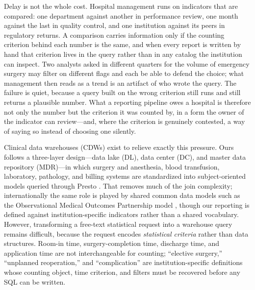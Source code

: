 \documentclass[10pt]{article}
\begin{document}
Delay is not the whole cost. Hospital management runs on indicators that are
compared: one department against another in performance review, one month against
the last in quality control, and one institution against its peers in regulatory
returns. A comparison carries information only if the counting criterion behind
each number is the same, and when every report is written by hand that criterion
lives in the query rather than in any catalog the institution can inspect. Two
analysts asked in different quarters for the volume of emergency surgery may
filter on different flags and each be able to defend the choice; what management
then reads as a trend is an artifact of who wrote the query. The failure is quiet,
because a query built on the wrong criterion still runs and still returns a
plausible number. What a reporting pipeline owes a hospital is therefore not only
the number but the criterion it was counted by, in a form the owner of the
indicator can review---and, where the criterion is genuinely contested, a way of
saying so instead of choosing one silently.

Clinical data warehouses (CDWs) exist to relieve exactly this pressure. Ours follows a three-layer design---data lake (DL), data center (DC), and master data repository (MDR)---in which surgery and anesthesia, blood transfusion, laboratory, pathology, and billing systems are standardized into subject-oriented models queried through Presto \cite{presto2019}. That removes much of the join complexity; internationally the same role is played by shared common data models such as the Observational Medical Outcomes Partnership model \cite{ohdsi2015}, though our reporting is defined against institution-specific indicators rather than a shared vocabulary. However, transforming a free-text
statistical request into a warehouse query remains difficult, because the
request encodes \emph{statistical criteria} rather than data structures. Room-in
time, surgery-completion time, discharge time, and application time are not
interchangeable for counting; ``elective surgery,'' ``unplanned reoperation,''
and ``complication'' are institution-specific definitions whose counting object,
time criterion, and filters must be recovered before any SQL can be written.
\end{document}
